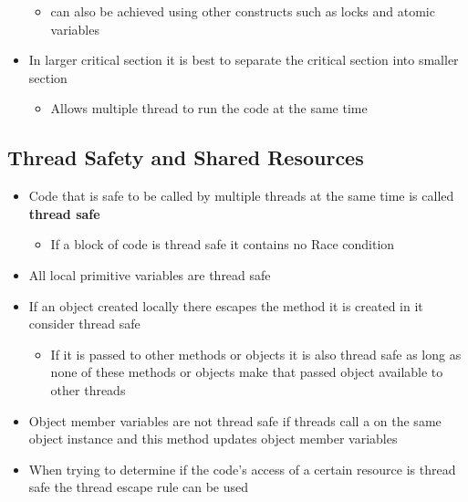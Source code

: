 \documentclass[11pt]{article}
\providecommand{\tightlist}{%
      \setlength{\itemsep}{0pt}\setlength{\parskip}{0pt}}
\begin{document}
\begin{itemize}
  \begin{itemize}
  \tightlist
  \item
    can also be achieved using other constructs such as locks and atomic
    variables
  \end{itemize}
\item
  In larger critical section it is best to separate the critical section
  into smaller section

  \begin{itemize}
  \tightlist
  \item
    Allows multiple thread to run the code at the same time
  \end{itemize}
\end{itemize}

    \hypertarget{thread-safety-and-shared-resources}{%
\subsection{Thread Safety and Shared
Resources}\label{thread-safety-and-shared-resources}}

\begin{itemize}
\tightlist
\item
  Code that is safe to be called by multiple threads at the same time is
  called \textbf{thread safe}

  \begin{itemize}
  \tightlist
  \item
    If a block of code is thread safe it contains no Race condition
  \end{itemize}
\item
  All local primitive variables are thread safe
\item
  If an object created locally there escapes the method it is created in
  it consider thread safe

  \begin{itemize}
  \tightlist
  \item
    If it is passed to other methods or objects it is also thread safe
    as long as none of these methods or objects make that passed object
    available to other threads
  \end{itemize}
\item
  Object member variables are not thread safe if threads call a on the
  same object instance and this method updates object member variables
\item
  When trying to determine if the code's access of a certain resource is
  thread safe the thread escape rule can be used
\end{itemize}
\end{document}
